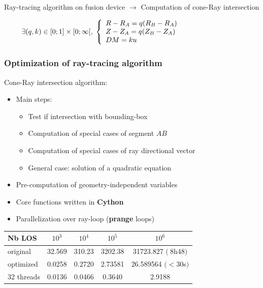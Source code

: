 \documentclass[10pt]{beamer}
\begin{document}
\begin{frame}
\vspace{0.3cm}
\begin{alertblock}{Ray-tracing algorithm on fusion device $\longrightarrow$ Computation of cone-Ray intersection}
\end{alertblock}

$$
\hspace{-3cm}
\exists (q,k) \in [0;1]\times [0;\infty[, \;
\left\{\begin{array}{ll}
R-R_A = q(R_B-R_A)\\
Z-Z_A = q(Z_B-Z_A)\\
DM = k u
\end{array}\right.
$$
	
\end{frame}


\begin{frame}
\frametitle{Optimization of ray-tracing algorithm}


Cone-Ray intersection algorithm:
	\begin{itemize}
	\item Main steps:
	\begin{itemize}
		\item Test if intersection with bounding-box
		\item Computation of special cases of segment $AB$
		\item Computation of special cases of ray directional vector
		\item General case: solution of a quadratic equation
	\end{itemize}
	\item Pre-computation of geometry-independent variables
	\item Core functions written in \textbf{Cython}
	\item Parallelization over ray-loop (\textbf{prange} loops)
	\end{itemize}

\begin{table}[h] %
    \centering
    \label{tab:LOS_init_sirrah}
     \begin{tabular}{@{}l*{4}{S[table-format=1.2e-1,scientific-notation=true]}@{}}
       \toprule
       \textbf{Nb LOS} &  {$10^3$} & {$10^4$} & {$10^5$} & {$10^6$}\\
       \midrule
       original       & 32.569 & 310.23 & 3202.38 & 31723.827 $(~8$h$48)$\\
       optimized   & 0.0258 & 0.2720 & 2.73581 & 26.589564 $(<30$s$)$\\
       32 threads & 0.0136 & 0.0466 & 0.3640 & 2.9188 \\
       \bottomrule
     \end{tabular}
\end{table}

	
\end{frame}
\end{document}
